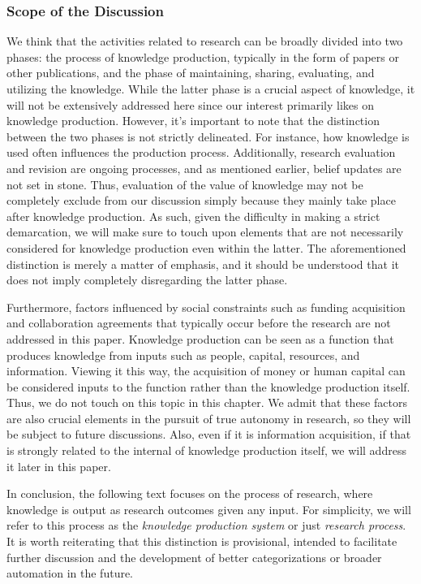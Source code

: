 \documentclass{book}
\begin{document}
\subsubsection{Scope of the Discussion}
We think that the activities related to research can be broadly divided into two phases: the process of knowledge production, typically in the form of papers or other publications, and the phase of maintaining, sharing, evaluating, and utilizing the knowledge. While the latter phase is a crucial aspect of knowledge, it will not be extensively addressed here since our interest primarily likes on knowledge production. However, it's important to note that the distinction between the two phases is not strictly delineated. For instance, how knowledge is used often influences the production process. Additionally, research evaluation and revision are ongoing processes, and as mentioned earlier, belief updates are not set in stone. Thus, evaluation of the value of knowledge may not be completely exclude from our discussion simply because they mainly take place after knowledge production. As such, given the difficulty in making a strict demarcation, we will make sure to touch upon elements that are not necessarily considered for knowledge production even within the latter. The aforementioned distinction is merely a matter of emphasis, and it should be understood that it does not imply completely disregarding the latter phase.

Furthermore, factors influenced by social constraints such as funding acquisition and collaboration agreements that typically occur before the research are not addressed in this paper. Knowledge production can be seen as a function that produces knowledge from inputs such as people, capital, resources, and information. Viewing it this way, the acquisition of money or human capital can be considered inputs to the function rather than the knowledge production itself. Thus, we do not touch on this topic in this chapter. We admit that these factors are also crucial elements in the pursuit of true autonomy in research, so they will be subject to future discussions. Also, even if it is information acquisition, if that is strongly related to the internal of knowledge production itself, we will address it later in this paper. 

In conclusion, the following text focuses on the process of research, where knowledge is output as research outcomes given any input. For simplicity, we will refer to this process as the \textit{knowledge production system} or just \textit{research process}. It is worth reiterating that this distinction is provisional, intended to facilitate further discussion and the development of better categorizations or broader automation in the future.
\end{document}
